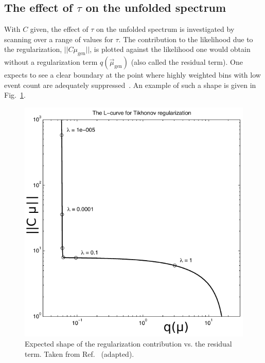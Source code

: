 \subsection{The effect of $\tau$ on the unfolded spectrum}

With $C$ given, the effect of $\tau$ on the unfolded spectrum is investigated by scanning over a range of values for $\tau$.
% 
The contribution to the likelihood due to the regularization, $|| C \mu_{\text{gen}} ||$, is plotted against the likelihood one would obtain without a regularization term $q(\vec{\mu}_{\text{gen}})$ (also called the residual term).
% 
One expects to see a clear boundary at the point where highly weighted bins with low event count are adequately suppressed~\cite{Hansen:LShape}.
% 
An example of such a shape is given in Fig.~\ref{fig:expectedlshape}.

\begin{figure}[ht]
 \begin{center}
   \includegraphics[width=\halflinewidth]{img/differentials/regularization/Lshape2.pdf}
   \caption{ Expected shape of the regularization contribution vs. the residual term. Taken from Ref.~\cite{Hansen:LShape} (adapted). }
   \label{fig:expectedlshape}
 \end{center}
\end{figure}



